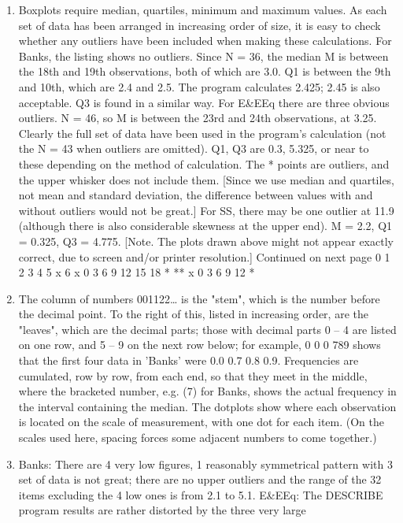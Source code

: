 \documentclass[a4paper,12pt]{article}
\begin{document}
\begin{enumerate} 
\item  Boxplots require median, quartiles, minimum and maximum values. As each
set of data has been arranged in increasing order of size, it is easy to check whether
any outliers have been included when making these calculations.
For Banks, the listing shows no outliers. Since N = 36, the median M is between the
18th and 19th observations, both of which are 3.0. Q1 is between the 9th and 10th,
which are 2.4 and 2.5. The program calculates 2.425; 2.45 is also acceptable. Q3 is
found in a similar way.
For E&EEq there are three obvious outliers. N = 46, so M is between the 23rd and
24th observations, at 3.25. Clearly the full set of data have been used in the program's
calculation (not the N = 43 when outliers are omitted). Q1, Q3 are 0.3, 5.325, or near
to these depending on the method of calculation.
The * points are outliers, and the upper whisker does not include them. [Since we use
median and quartiles, not mean and standard deviation, the difference between values
with and without outliers would not be great.]
For SS, there may be one outlier at 11.9 (although there is also considerable skewness
at the upper end). M = 2.2, Q1 = 0.325, Q3 = 4.775.
[Note. The plots drawn above might not appear exactly correct, due to screen and/or printer
resolution.]
Continued on next page
0 1 2 3 4 5
x
6
x
0 3 6 9 12 15 18
* **
x
0 3 6 9 12
*
\item  The column of numbers 001122… is the "stem", which is the number before
the decimal point. To the right of this, listed in increasing order, are the "leaves",
which are the decimal parts; those with decimal parts 0 – 4 are listed on one row, and
5 – 9 on the next row below; for example,
0 0
0 789
shows that the first four data in
'Banks' were 0.0 0.7 0.8 0.9.
Frequencies are cumulated, row by row, from each end, so that they meet in the
middle, where the bracketed number, e.g. (7) for Banks, shows the actual frequency in
the interval containing the median.
The dotplots show where each observation is located on the scale of measurement,
with one dot for each item. (On the scales used here, spacing forces some adjacent
numbers to come together.)
\item  Banks: There are 4 very low figures, 1%
reasonably symmetrical pattern with 3%
set of data is not great; there are no upper outliers and the range of the 32 items
excluding the 4 low ones is from 2.1 to 5.1.
E&EEq: The DESCRIBE program results are rather distorted by the three very large

\end{enumerate}
\end{document}
